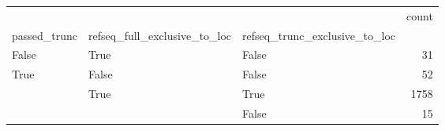 \begin{tabular}{lllr}
\toprule
 &  &  & count \\
passed_trunc & refseq_full_exclusive_to_loc & refseq_trunc_exclusive_to_loc &  \\
\midrule
False & True & False & 31 \\
\cline{1-4} \cline{2-4}
\multirow[t]{3}{*}{True} & False & False & 52 \\
\cline{2-4}
 & \multirow[t]{2}{*}{True} & True & 1758 \\
 &  & False & 15 \\
\cline{1-4} \cline{2-4}
\bottomrule
\end{tabular}
